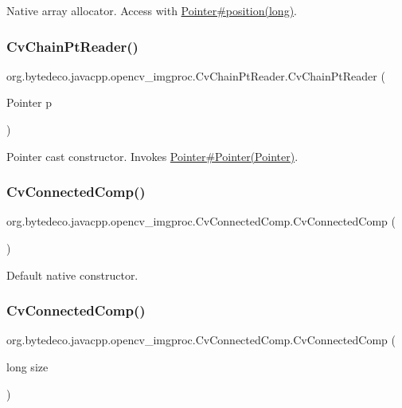 Native array allocator. Access with \hyperlink{}{Pointer\#position(long)}. \mbox{\label{group__imgproc_ga1288813916b70ce66630223fde9fbb95}} 
\subsubsection{\texorpdfstring{Cv\+Chain\+Pt\+Reader()}{CvChainPtReader()}\hspace{0.1cm}{\footnotesize\ttfamily [3/3]}}
{\footnotesize\ttfamily org.\+bytedeco.\+javacpp.\+opencv\+\_\+imgproc.\+Cv\+Chain\+Pt\+Reader.\+Cv\+Chain\+Pt\+Reader (\begin{DoxyParamCaption}\item[{Pointer}]{p }\end{DoxyParamCaption})\hspace{0.3cm}{\ttfamily [inline]}}

Pointer cast constructor. Invokes \hyperlink{}{Pointer\#\+Pointer(\+Pointer)}. \mbox{\label{group__imgproc_ga1105093a8f885cea9506ce309f08ca16}} 
\subsubsection{\texorpdfstring{Cv\+Connected\+Comp()}{CvConnectedComp()}\hspace{0.1cm}{\footnotesize\ttfamily [1/3]}}
{\footnotesize\ttfamily org.\+bytedeco.\+javacpp.\+opencv\+\_\+imgproc.\+Cv\+Connected\+Comp.\+Cv\+Connected\+Comp (\begin{DoxyParamCaption}{ }\end{DoxyParamCaption})\hspace{0.3cm}{\ttfamily [inline]}}

Default native constructor. \mbox{\label{group__imgproc_ga2439ac8c5f34b2228d9ff08c3f549945}} 
\subsubsection{\texorpdfstring{Cv\+Connected\+Comp()}{CvConnectedComp()}\hspace{0.1cm}{\footnotesize\ttfamily [2/3]}}
{\footnotesize\ttfamily org.\+bytedeco.\+javacpp.\+opencv\+\_\+imgproc.\+Cv\+Connected\+Comp.\+Cv\+Connected\+Comp (\begin{DoxyParamCaption}\item[{long}]{size }\end{DoxyParamCaption})\hspace{0.3cm}{\ttfamily [inline]}}

